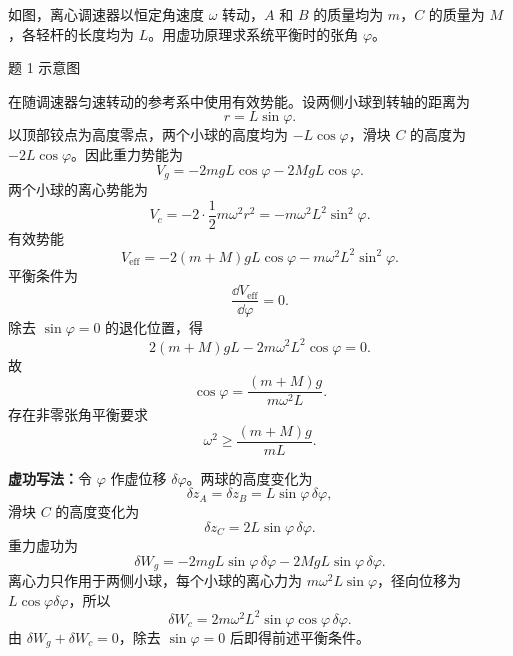 
\begin{question}[离心调速器]
如图，离心调速器以恒定角速度 $\omega$ 转动，$A$ 和 $B$ 的质量均为 $m$，$C$ 的质量为 $M$，各轻杆的长度均为 $L$。用虚功原理求系统平衡时的张角 $\varphi$。

\begin{center}

{\small 题 1 示意图}
\end{center}

\begin{solution}
在随调速器匀速转动的参考系中使用有效势能。设两侧小球到转轴的距离为
\[
  r=L\sin\varphi.
\]
以顶部铰点为高度零点，两个小球的高度均为 $-L\cos\varphi$，滑块 $C$ 的高度为 $-2L\cos\varphi$。因此重力势能为
\[
  V_g=-2mgL\cos\varphi-2MgL\cos\varphi.
\]
两个小球的离心势能为
\[
  V_c=-2\cdot\frac12m\omega^2r^2=-m\omega^2L^2\sin^2\varphi.
\]
有效势能
\[
  V_{\mathrm{eff}}=-2(m+M)gL\cos\varphi-m\omega^2L^2\sin^2\varphi.
\]
平衡条件为
\[
  \frac{\dd V_{\mathrm{eff}}}{\dd\varphi}=0.
\]
除去 $\sin\varphi=0$ 的退化位置，得
\[
  2(m+M)gL-2m\omega^2L^2\cos\varphi=0.
\]
故
\[
  \boxed{\cos\varphi=\frac{(m+M)g}{m\omega^2L}}.
\]
存在非零张角平衡要求
\[
  \boxed{\omega^2\ge \frac{(m+M)g}{mL}}.
\]


\medskip
\textbf{虚功写法：}令 $\varphi$ 作虚位移 $\delta\varphi$。两球的高度变化为
\[
  \delta z_A=\delta z_B=L\sin\varphi\,\delta\varphi,
\]
滑块 $C$ 的高度变化为
\[
  \delta z_C=2L\sin\varphi\,\delta\varphi.
\]
重力虚功为
\[
  \delta W_g=-2mgL\sin\varphi\,\delta\varphi
  -2MgL\sin\varphi\,\delta\varphi.
\]
离心力只作用于两侧小球，每个小球的离心力为 $m\omega^2L\sin\varphi$，径向位移为 $L\cos\varphi\delta\varphi$，所以
\[
  \delta W_c=2m\omega^2L^2\sin\varphi\cos\varphi\,\delta\varphi.
\]
由 $\delta W_g+\delta W_c=0$，除去 $\sin\varphi=0$ 后即得前述平衡条件。
\end{solution}
\end{question}

